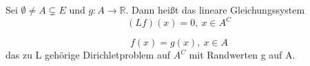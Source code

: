 Sei $\emptyset \neq A \subsetneq E$ und $g: A \to \mathbb{R}$. Dann heißt das lineare Gleichungssystem 
\begin{equation*}
(Lf)(x) = 0, \: x \in A^{C}
\end{equation*}

 \begin{equation*}
f(x) = g(x), \: x \in A
\end{equation*}
\noindent
das zu L gehörige Dirichletproblem auf $A^{C}$ mit Randwerten g auf A.     
